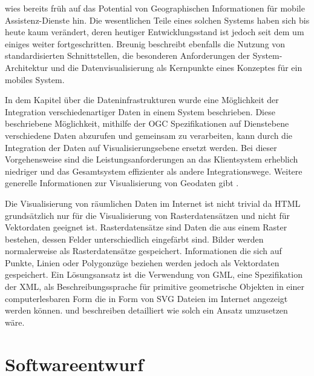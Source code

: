 \citep{breunig_entwicklung_2003} wies bereits früh auf das Potential von Geographischen Informationen für mobile Assistenz-Dienste hin. Die wesentlichen Teile eines solchen Systems haben sich bis heute kaum verändert, deren heutiger Entwicklungsstand ist jedoch seit dem um einiges weiter fortgeschritten. Breunig beschreibt ebenfalls die Nutzung von standardisierten Schnittstellen, die besonderen Anforderungen der System-Architektur und die Datenvisualisierung als Kernpunkte eines Konzeptes für ein mobiles System.

In dem Kapitel über die Dateninfrastrukturen wurde eine Möglichkeit der Integration verschiedenartiger Daten in einem System beschrieben. Diese beschriebene Möglichkeit, mithilfe der \gls{OGC} Spezifikationen auf Dienstebene verschiedene Daten abzurufen und gemeinsam zu verarbeiten, kann durch die Integration der Daten auf Visualisierungsebene ersetzt werden. Bei dieser Vorgehensweise sind die Leistungsanforderungen an das Klientsystem erheblich niedriger und das Gesamtsystem effizienter als andere Integrationswege. Weitere generelle Informationen zur Visualisierung von Geodaten gibt \citep{dollner_techniken_2007}.

Die Visualisierung von räumlichen Daten im Internet ist nicht trivial da \gls{HTML} grundsätzlich nur für die Visualisierung von Rasterdatensätzen und nicht für Vektordaten geeignet ist. Rasterdatensätze sind Daten die aus einem Raster bestehen, dessen Felder unterschiedlich eingefärbt sind. Bilder werden normalerweise als Rasterdatensätze gespeichert. Informationen die sich auf Punkte, Linien oder Polygonzüge beziehen werden jedoch als Vektordaten gespeichert. Ein Lösungsansatz ist die Verwendung von \gls{GML}, eine Spezifikation der \gls{XML}, als Beschreibungssprache für primitive geometrische Objekten in einer computerlesbaren Form die in Form von \gls{SVG} Dateien im Internet angezeigt werden können. \citep{brinkhoff_architektur_2001} und \citep{neumann_modellierung_2004} beschreiben detailliert wie solch ein Ansatz umzusetzen wäre.





\chapter{Softwareentwurf}
